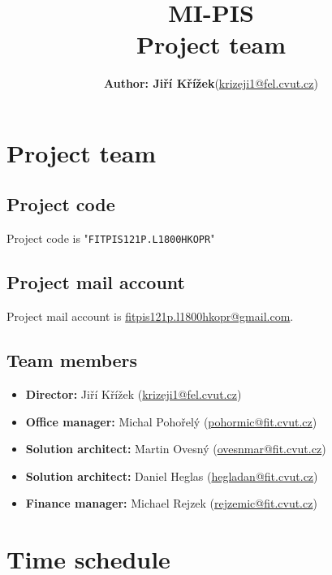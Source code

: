 \documentclass[12pt]{article}
\begin{document}
\title{MI-PIS
\\\small{Project team}
} 

\dmyyyydate


\author{
\begin{tabular}{ l r } 
  \bf Author: Jiří Křížek & (\url{krizeji1@fel.cvut.cz})
\end{tabular}}

\maketitle


\section{Project team}
  \subsection{Project code}
  Project code is "\texttt{FITPIS121P.L1800HKOPR}"
  
  \subsection{Project mail account}
  Project mail account is \url{fitpis121p.l1800hkopr@gmail.com}.
  
  \subsection{Team members}
    \begin{itemize}
      \item{{\bf Director:} Jiří Křížek (\url{krizeji1@fel.cvut.cz})}
      \item{{\bf Office manager:} Michal Pohořelý (\url{pohormic@fit.cvut.cz})}
      \item{{\bf Solution architect:} Martin Ovesný (\url{ovesnmar@fit.cvut.cz})}
      \item{{\bf Solution architect:} Daniel Heglas (\url{hegladan@fit.cvut.cz})}
      \item{{\bf Finance manager:} Michael Rejzek (\url{rejzemic@fit.cvut.cz})}
    \end{itemize}

\section{Time schedule}
\end{document}
